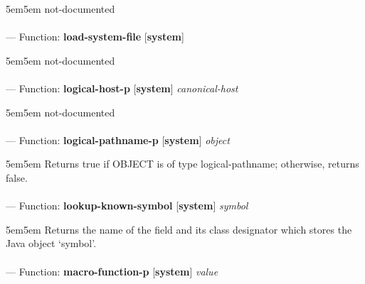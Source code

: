 \begin{adjustwidth}{5em}{5em}
not-documented
\end{adjustwidth}

\paragraph{}
\label{SYSTEM:LOAD-SYSTEM-FILE}
--- Function: \textbf{load-system-file} [\textbf{system}] \textit{}

\begin{adjustwidth}{5em}{5em}
not-documented
\end{adjustwidth}

\paragraph{}
\label{SYSTEM:LOGICAL-HOST-P}
--- Function: \textbf{logical-host-p} [\textbf{system}] \textit{canonical-host}

\begin{adjustwidth}{5em}{5em}
not-documented
\end{adjustwidth}

\paragraph{}
\label{SYSTEM:LOGICAL-PATHNAME-P}
--- Function: \textbf{logical-pathname-p} [\textbf{system}] \textit{object}

\begin{adjustwidth}{5em}{5em}
Returns true if OBJECT is of type logical-pathname; otherwise, returns false.
\end{adjustwidth}

\paragraph{}
\label{SYSTEM:LOOKUP-KNOWN-SYMBOL}
--- Function: \textbf{lookup-known-symbol} [\textbf{system}] \textit{symbol}

\begin{adjustwidth}{5em}{5em}
Returns the name of the field and its class designator
which stores the Java object `symbol'.
\end{adjustwidth}

\paragraph{}
\label{SYSTEM:MACRO-FUNCTION-P}
--- Function: \textbf{macro-function-p} [\textbf{system}] \textit{value}

